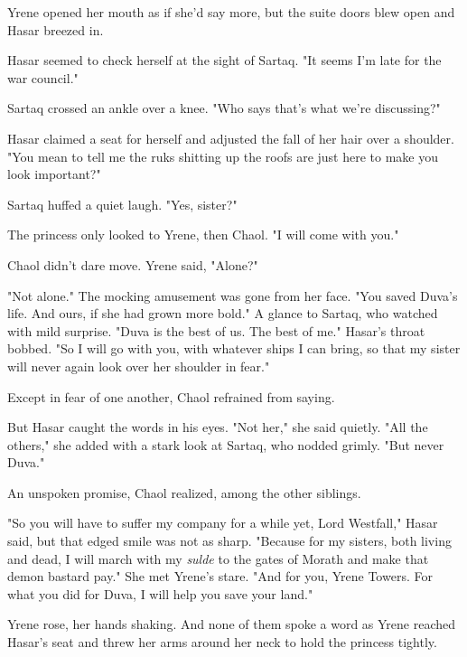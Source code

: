 Yrene opened her mouth as if she'd say more, but the suite doors blew open and Hasar breezed in.

Hasar seemed to check herself at the sight of Sartaq.
"It seems I'm late for the war council."

Sartaq crossed an ankle over a knee.
"Who says that's what we're discussing?"

Hasar claimed a seat for herself and adjusted the fall of her hair over a shoulder.
"You mean to tell me the ruks shitting up the roofs are just here to make you look important?"

Sartaq huffed a quiet laugh.
"Yes, sister?"

The princess only looked to Yrene, then Chaol.
"I will come with you."

Chaol didn't dare move.
Yrene said, "Alone?"

"Not alone."
The mocking amusement was gone from her face.
"You saved Duva's life.
And ours, if she had grown more bold."
A glance to Sartaq, who watched with mild surprise.
"Duva is the best of us.
The best of me."
Hasar's throat bobbed.
"So I will go with you, with whatever ships I can bring, so that my sister will never again look over her shoulder in fear."

Except in fear of one another, Chaol refrained from saying.

But Hasar caught the words in his eyes.
"Not her," she said quietly.
"All the others," she added with a stark look at Sartaq, who nodded grimly.
"But never Duva."

An unspoken promise, Chaol realized, among the other siblings.

"So you will have to suffer my company for a while yet, Lord Westfall," Hasar said, but that edged smile was not as sharp.
"Because for my sisters, both living and dead, I will march with my \emph{sulde}
to the gates of Morath and make that demon bastard pay."
She met Yrene's stare.
"And for you, Yrene Towers.
For what you did for Duva, I will help you save your land."

Yrene rose, her hands shaking.
And none of them spoke a word as Yrene reached Hasar's seat and threw her arms around her neck to hold the princess tightly.

